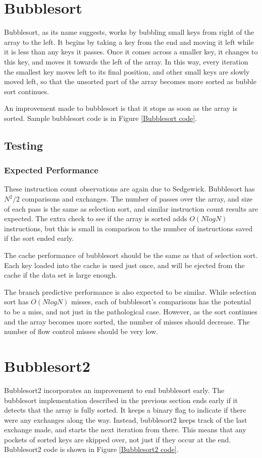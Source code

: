 \section{Bubblesort}
Bubblesort, as its name suggests, works by bubbling small keys from right of
the array to the left. It begins by taking a key from the end and moving it left
while it is less than any keys it passes. Once it comes across a smaller key, it
changes to this key, and moves it towards the left of the array. In this way, every
iteration the smallest key moves left to its final position, and other small
keys are slowly moved left, so that the unsorted part of the array becomes more
sorted as bubble sort continues.

An improvement made to bubblesort is that it stops as soon as the array is
sorted. Sample bubblesort code is in Figure \vref{Bubblesort code}.

\subsection{Testing}
\subsubsection{Expected Performance}
These instruction count observations are again due to Sedgewick.  Bubblesort has
$N^2/2$ comparisons and exchanges. The number of passes over the array, and size
of each pass is the same as selection sort, and similar instruction count
results are expected.  The extra check to see if the array is sorted adds
$O(NlogN)$ instructions, but this is small in comparison to the number of
instructions saved if the sort ended early.

The cache performance of bubblesort should be the same as that of selection
sort. Each key loaded into the cache is used just once, and will be ejected from
the cache if the data set is large enough.

The branch predictive performance is also expected to be similar. While
selection sort has $O(NlogN)$ misses, each of bubblesort's comparisons has
the potential to be a miss, and not just in the pathological case. However, as
the sort continues and the array becomes more sorted, the number of misses
should decrease. The number of flow control misses should be very low.

\section{Bubblesort2}
Bubblesort2 incorporates an improvement to end bubblesort early. The bubblesort
implementation described in the previous section ends early if it detects that
the array is fully sorted.  It keeps a binary flag to indicate if there were any
exchanges along the way.  Instead, bubblesort2 keeps track of the last exchange
made, and starts the next iteration from there. This means that any pockets of
sorted keys are skipped over, not just if they occur at the end. Bubblesort2
code is shown in Figure \vref{Bubblesort2 code}.

